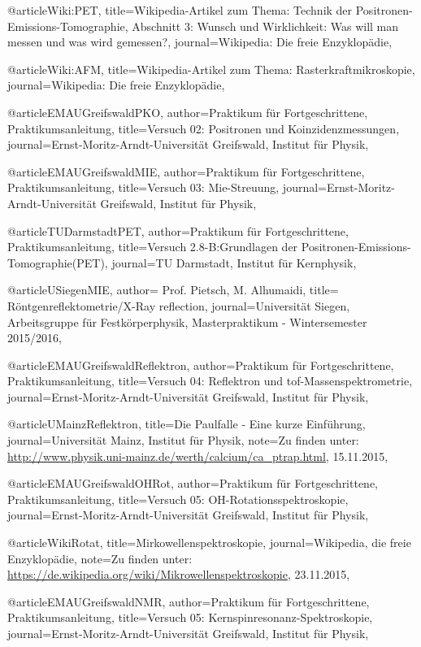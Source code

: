 @article{Wiki:PET,
	title={{Wikipedia-Artikel zum Thema: Technik der Positronen-Emissions-Tomographie, Abschnitt 3: Wunsch und Wirklichkeit: Was will man messen und was wird gemessen?}},
	journal={Wikipedia: Die freie Enzyklopädie},
}

@article{Wiki:AFM,
	title={{Wikipedia-Artikel zum Thema: Rasterkraftmikroskopie}},
	journal={Wikipedia: Die freie Enzyklopädie},
}

@article{EMAUGreifswaldPKO,
	author={Praktikum für Fortgeschrittene, Praktikumsanleitung},
	title={Versuch 02: Positronen und Koinzidenzmessungen},
	journal={Ernst-Moritz-Arndt-Universität Greifswald, Institut für Physik},
}

@article{EMAUGreifswaldMIE,
	author={Praktikum für Fortgeschrittene, Praktikumsanleitung},
	title={Versuch 03: Mie-Streuung},
	journal={Ernst-Moritz-Arndt-Universität Greifswald, Institut für Physik},
}

@article{TUDarmstadtPET,
	author={Praktikum für Fortgeschrittene, Praktikumsanleitung},
	title={Versuch 2.8-B:Grundlagen der Positronen-Emissions-Tomographie(PET)},
	journal={TU Darmstadt, Institut für Kernphysik},
}

@article{USiegenMIE,
	author={ Prof. Pietsch, M. Alhumaidi},
	title={ Röntgenreflektometrie/X-Ray reflection},
	journal={Universität Siegen, Arbeitsgruppe für Festkörperphysik, Masterpraktikum - Wintersemester 2015/2016},
}

@article{EMAUGreifswaldReflektron,
	author={Praktikum für Fortgeschrittene, Praktikumsanleitung},
	title={Versuch 04: Reflektron und tof-Massenspektrometrie},
	journal={Ernst-Moritz-Arndt-Universität Greifswald, Institut für Physik},
}

@article{UMainzReflektron,
	title={Die Paulfalle - Eine kurze Einführung},
	journal={Universität Mainz, Institut für Physik},
	note={Zu finden unter: \url{http://www.physik.uni-mainz.de/werth/calcium/ca_ptrap.html}, 15.11.2015},
}

@article{EMAUGreifswaldOHRot,
	author={Praktikum für Fortgeschrittene, Praktikumsanleitung},
	title={Versuch 05: OH-Rotationsspektroskopie},
	journal={Ernst-Moritz-Arndt-Universität Greifswald, Institut für Physik},
}

@article{WikiRotat,
	title={Mirkowellenspektroskopie},
	journal={Wikipedia, die freie Enzyklopädie},
	note={Zu finden unter: \url{https://de.wikipedia.org/wiki/Mikrowellenspektroskopie}, 23.11.2015},
}

@article{EMAUGreifswaldNMR,
	author={Praktikum für Fortgeschrittene, Praktikumsanleitung},
	title={Versuch 05: Kernspinresonanz-Spektroskopie},
	journal={Ernst-Moritz-Arndt-Universität Greifswald, Institut für Physik},
}

